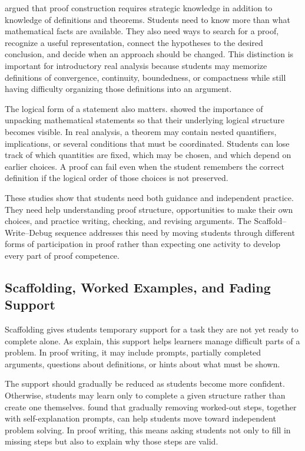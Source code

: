 \documentclass[12pt]{article}
\begin{document}
\textcite{weber2001} argued that proof construction requires strategic knowledge in addition to knowledge of definitions and theorems. Students need to know more than what mathematical facts are available. They also need ways to search for a proof, recognize a useful representation, connect the hypotheses to the desired conclusion, and decide when an approach should be changed. This distinction is important for introductory real analysis because students may memorize definitions of convergence, continuity, boundedness, or compactness while still having difficulty organizing those definitions into an argument.

The logical form of a statement also matters. \textcite{selden1995} showed the importance of unpacking mathematical statements so that their underlying logical structure becomes visible. In real analysis, a theorem may contain nested quantifiers, implications, or several conditions that must be coordinated. Students can lose track of which quantities are fixed, which may be chosen, and which depend on earlier choices. A proof can fail even when the student remembers the correct definition if the logical order of those choices is not preserved.

These studies show that students need both guidance and independent practice. They need help understanding proof structure, opportunities to make their own choices, and practice writing, checking, and revising arguments. The Scaffold--Write--Debug sequence addresses this need by moving students through different forms of participation in proof rather than expecting one activity to develop every part of proof competence.

\subsection{Scaffolding, Worked Examples, and Fading Support}

Scaffolding gives students temporary support for a task they are not yet ready to complete alone. As \textcite{wood1976} explain, this support helps learners manage difficult parts of a problem. In proof writing, it may include prompts, partially completed arguments, questions about definitions, or hints about what must be shown.

The support should gradually be reduced as students become more confident. Otherwise, students may learn only to complete a given structure rather than create one themselves. \textcite{atkinson2003} found that gradually removing worked-out steps, together with self-explanation prompts, can help students move toward independent problem solving. In proof writing, this means asking students not only to fill in missing steps but also to explain why those steps are valid.
\end{document}

